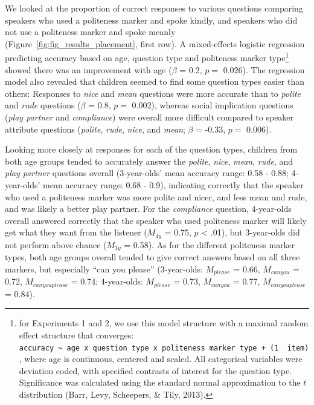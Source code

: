 \documentclass[10pt, letterpaper]{article}
\begin{document}
We looked at the proportion of correct responses to various questions
comparing speakers who used a politeness marker and spoke kindly, and
speakers who did not use a politeness marker and spoke meanly
(Figure~\ref{fig:fig_results_placement}, first row). A mixed-effects
logistic regression predicting accuracy based on age, question type and
politeness marker type\footnote{for Experiments 1 and 2, we use this
  model structure with a maximal random effect structure that converges:
  \texttt{accuracy\ \textasciitilde{}\ age\ x\ question\ type\ x\ politeness\ marker\ type\ +\ (1\ \textbar{}\ item)},
  where age is continuous, centered and scaled. All categorical
  variables were deviation coded, with specified contrasts of interest
  for the question type. Significance was calculated using the standard
  normal approximation to the \(t\) distribution (Barr, Levy, Scheepers,
  \& Tily, 2013).} showed there was an improvement with age (\(\beta\) =
0.2, \(p =\) 0.026). The regression model also revealed that children
seemed to find some question types easier than others: Responses to
\emph{nice} and \emph{mean} questions were more accurate than to
\emph{polite} and \emph{rude} questions (\(\beta\) = 0.8, \(p =\)
0.002), whereas social implication questions (\emph{play partner} and
\emph{compliance}) were overall more difficult compared to speaker
attribute questions (\emph{polite}, \emph{rude}, \emph{nice}, and
\emph{mean}; \(\beta\) = -0.33, \(p =\) 0.006).

Looking more closely at responses for each of the question types,
children from both age groups tended to accurately answer the
\emph{polite}, \emph{nice}, \emph{mean}, \emph{rude}, and \emph{play
partner} questions overall (3-year-olds' mean accuracy range: 0.58 -
0.88; 4-year-olds' mean accuracy range: 0.68 - 0.9), indicating
correctly that the speaker who used a politeness marker was more polite
and nicer, and less mean and rude, and was likely a better play partner.
For the \emph{compliance} question, 4-year-olds overall answered
correctly that the speaker who used politeness marker will likely get
what they want from the listener (\(M_{4y}\) = 0.75, \(p\) \textless{}
.01), but 3-year-olds did not perform above chance (\(M_{3y}\) = 0.58).
As for the different politeness marker types, both age groups overall
tended to give correct answers based on all three markers, but
especially ``can you please'' (3-year-olds: \(M_{please}\) = 0.66,
\(M_{can you}\) = 0.72, \(M_{can you please}\) = 0.74; 4-year-olds:
\(M_{please}\) = 0.73, \(M_{can you}\) = 0.77, \(M_{can you please}\) =
0.84).
\end{document}
